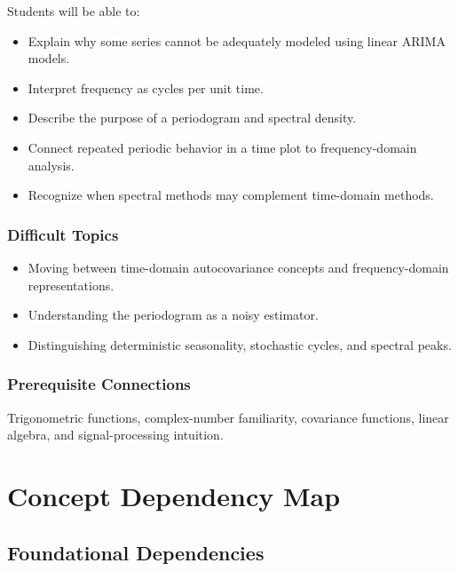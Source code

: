 \documentclass[11pt]{article}
\begin{document}
Students will be able to:

\begin{itemize}
    \item Explain why some series cannot be adequately modeled using linear
    ARIMA models.
    \item Interpret frequency as cycles per unit time.
    \item Describe the purpose of a periodogram and spectral density.
    \item Connect repeated periodic behavior in a time plot to frequency-domain
    analysis.
    \item Recognize when spectral methods may complement time-domain methods.
\end{itemize}

\subsubsection{Difficult Topics}

\begin{itemize}
    \item Moving between time-domain autocovariance concepts and
    frequency-domain representations.
    \item Understanding the periodogram as a noisy estimator.
    \item Distinguishing deterministic seasonality, stochastic cycles, and
    spectral peaks.
\end{itemize}

\subsubsection{Prerequisite Connections}

Trigonometric functions, complex-number familiarity, covariance functions,
linear algebra, and signal-processing intuition.

\section{Concept Dependency Map}

\subsection{Foundational Dependencies}
\end{document}
